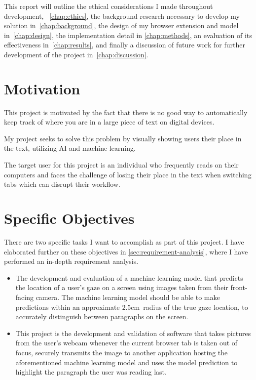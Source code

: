 \documentclass{report}
\begin{document}
This report will outline the ethical considerations I made throughout development, ~\autoref{chap:ethics}, the background research necessary to develop my solution in~\autoref{chap:background}, the design of my browser extension and model in~\autoref{chap:design}, the implementation detail in \autoref{chap:methods}, an evaluation of its effectiveness in~\autoref{chap:results}, and finally a discussion of future work for further development of the project in~\autoref{chap:discussion}.


\section{Motivation}

This project is motivated by the fact that there is no good way to automatically keep track of where you are in a large piece of text on digital devices.

My project seeks to solve this problem by visually showing users their place in the text, utilizing AI and machine learning.

The target user for this project is an individual who frequently reads on their computers and faces the challenge of losing their place in the text when switching tabs which can disrupt their workflow.

\section{Specific Objectives}\label{sec:specific-objectives}

There are two specific tasks I want to accomplish as part of this project. I have elaborated further on these objectives in \autoref{sec:requirement-analysis}, where I have performed an in-depth requirement analysis. 

\begin{itemize}
    \item The development and evaluation of a machine learning model that predicts the location of a user's gaze on a screen using images taken from their front-facing camera. The machine learning model should be able to make predictions within an approximate \(2.5\text{cm}\)~radius of the true gaze location, to accurately distinguish between paragraphs on the screen.
    \item This project is the development and validation of software that takes pictures from the user's webcam whenever the current browser tab is taken out of focus, securely transmits the image to another application hosting the aforementioned machine learning model and uses the model prediction to highlight the paragraph the user was reading last.
\end{itemize}
\end{document}
